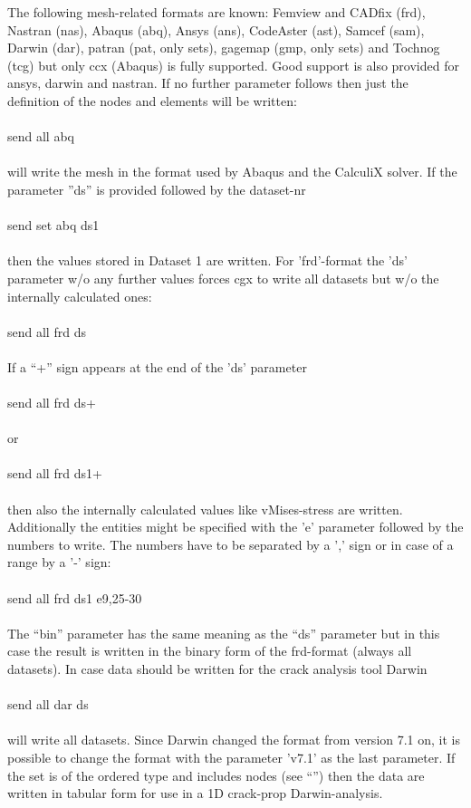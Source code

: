 \documentclass{article}
\begin{document}
The following mesh-related formats are known: Femview and CADfix (frd), Nastran (nas), Abaqus (abq), Ansys (ans), CodeAster (ast), Samcef (sam), Darwin (dar), patran (pat, only sets), gagemap (gmp, only sets) and Tochnog (tcg) but only ccx (Abaqus) is fully supported. Good support is also provided for ansys, darwin and nastran. If no further parameter follows then just the definition of the nodes and elements will be written:\\\\send all abq\\\\will write the mesh in the format used by Abaqus and the CalculiX solver. If the parameter ''ds'' is provided followed by the dataset-nr\\\\send set abq ds1\\\\then the values stored in Dataset 1 are written. For 'frd'-format the 'ds' parameter w/o any further values forces cgx to write all datasets but w/o the internally calculated ones:\\\\send all frd ds\\\\If a ``+'' sign appears at the end of the 'ds' parameter\\\\send all frd ds+\\\\or \\\\send all frd ds1+\\\\then also the internally calculated values like vMises-stress are written. Additionally the entities might be specified with the 'e' parameter followed by the numbers to write. The numbers have to be separated by a ',' sign or in case of a range by a '-' sign:\\\\send all frd ds1 e9,25-30\\\\ The ``bin'' parameter has the same meaning as the ``ds'' parameter but in this case the result is written in the binary form of the frd-format (always all datasets). In case data should be written for the crack analysis tool Darwin\\\\send all dar ds\\\\will write all datasets. Since Darwin changed the format from version 7.1 on, it is possible to change the format with the parameter 'v7.1' as the last parameter. If the set is of the ordered type and includes nodes (see ``'') then the data are written in tabular form for use in a 1D crack-prop Darwin-analysis.
\end{document}
